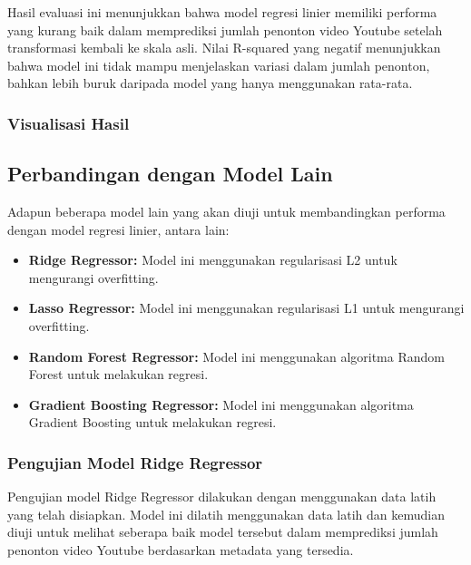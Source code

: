 Hasil evaluasi ini menunjukkan bahwa model regresi linier memiliki performa yang kurang baik dalam memprediksi jumlah penonton video Youtube setelah transformasi kembali ke skala asli. Nilai R-squared yang negatif menunjukkan bahwa model ini tidak mampu menjelaskan variasi dalam jumlah penonton, bahkan lebih buruk daripada model yang hanya menggunakan rata-rata.

\subsubsection{Visualisasi Hasil}

\lipsum[1-2]

\subsection{Perbandingan dengan Model Lain}
Adapun beberapa model lain yang akan diuji untuk membandingkan performa dengan model regresi linier, antara lain:
\begin{itemize}
    \item \textbf{Ridge Regressor:} Model ini menggunakan regularisasi L2 untuk mengurangi overfitting.
    \item \textbf{Lasso Regressor:} Model ini menggunakan regularisasi L1 untuk mengurangi overfitting. 
    \item \textbf{Random Forest Regressor:} Model ini menggunakan algoritma Random Forest untuk melakukan regresi.
    \item \textbf{Gradient Boosting Regressor:} Model ini menggunakan algoritma Gradient Boosting untuk melakukan regresi.
\end{itemize}

\subsubsection{Pengujian Model Ridge Regressor}
Pengujian model Ridge Regressor dilakukan dengan menggunakan data latih yang telah disiapkan. Model ini dilatih menggunakan data latih dan kemudian diuji untuk melihat seberapa baik model tersebut dalam memprediksi jumlah penonton video Youtube berdasarkan metadata yang tersedia.

